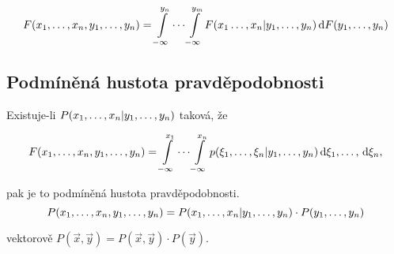 	\[ F(x_1,\ldots,x_n,y_1,\ldots,y_n) = \int\limits_{-\infty}^{y_n}\cdots\int\limits_{-\infty}^{y_m} F(x_1\ldots,x_n|y_1,\ldots,y_n)\d F(y_1,\ldots,y_n) \]

	\subsection{Podmíněná hustota pravděpodobnosti}
	Existuje-li $P(\svecrow[x]|\svecrow[y])$ taková, že

	\[ F(\svecrow[x],\svecrow[y])=\int\limits_{-\infty}^{x_1}\cdots\int\limits_{-\infty}^{x_n}p(\svecrow[\xi]|\svecrow[y])\svecrow[\d\xi], \]

	pak je to podmíněná hustota pravděpodobnosti.
	\[ P(\svecrow[x],\svecrow[y])=P(\svecrow[x]|\svecrow[y])\cdot P(\svecrow[y]) \]

	vektorově $P(\vec{x},\vec{y})=P(\vec{x},\vec{y})\cdot P(\vec{y})$.